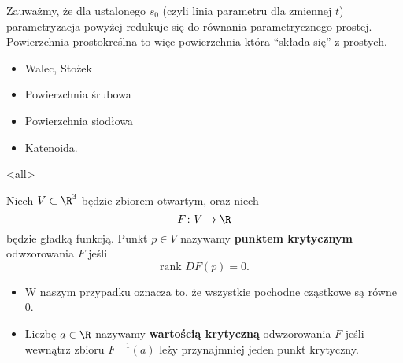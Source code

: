 \begin{frame}[<+->]

\begin{uwaga}
Zauważmy, że dla ustalonego $s_0$ (czyli linia parametru dla zmiennej $t$) parametryzacja powyżej redukuje się do równania parametrycznego prostej. Powierzchnia prostokreślna to więc powierzchnia która ``składa się'' z prostych.
\end{uwaga}
\begin{itemize}
\item Walec, Stożek
\item Powierzchnia śrubowa
\item Powierzchnia siodłowa
\item Katenoida.
\end{itemize}

\end{frame}
\mode<all>{}
\begin{frame}[<+->]

\begin{definicja}
Niech $V\subset \R^3$ będzie zbiorem otwartym, oraz niech \[F\colon V\to \R\] będzie gładką funkcją. 
Punkt $p\in V$ nazywamy \textbf{punktem krytycznym} odwzorowania $F$ jeśli \[\text{rank }DF(p)=0.\]
\end{definicja}
\begin{itemize}
\item {}W naszym przypadku oznacza to, że wszystkie pochodne cząstkowe są równe $0$.
\item Liczbę $a\in \R$ nazywamy \textbf{wartością krytyczną} odwzorowania $F$ jeśli wewnątrz zbioru $F^{\,-1}(a)$ leży przynajmniej jeden punkt krytyczny.
\end{itemize}

\end{frame}
